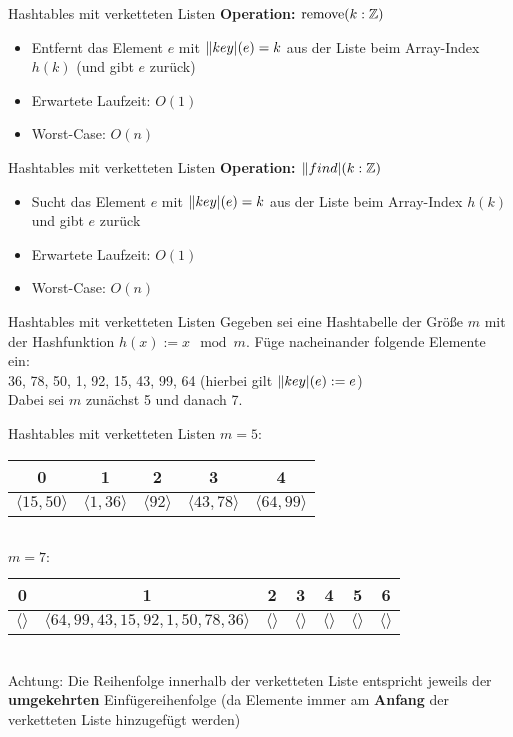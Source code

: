 \begin{frame}{Hashtables mit verketteten Listen}
	\textbf{Operation: $\|remove|(k : \Z)$} \\[0,125cm]
	\begin{itemize}
		\item Entfernt das Element $e$ mit $\key(e) = k$ aus der Liste beim Array-Index $h(k)$ (und gibt $e$ zurück)
		\pause
		\item Erwartete Laufzeit: $O(1)$
		\item Worst-Case: $O(n)$
	\end{itemize}
\end{frame}

\begin{frame}{Hashtables mit verketteten Listen}
	\textbf{Operation: $\|find|(k : \Z)$} \\[0,125cm]
	\begin{itemize}
		\item Sucht das Element $e$ mit $\key(e) = k$ aus der Liste beim Array-Index $h(k)$ und gibt $e$ zurück
		\pause
		\item Erwartete Laufzeit: $O(1)$
		\item Worst-Case: $O(n)$
	\end{itemize}
\end{frame}


\begin{frame}{Hashtables mit verketteten Listen}
	Gegeben sei eine Hashtabelle der Größe $m$ mit der Hashfunktion $h(x) := x \mod m$. Füge nacheinander folgende Elemente ein: \\ 
	36, 78, 50, 1, 92, 15, 43, 99, 64 \quad  (hierbei gilt $\key(e) := e$) \\
	Dabei sei $m$ zunächst 5 und danach 7.
\end{frame}

\begin{frame}{Hashtables mit verketteten Listen}
	\solutionheading
	$m = 5:$
	\begin{tabular}{ | c | c | c | c | c | }
		\hline
		0 & 1 & 2 & 3 & 4
		\\ \hline
		$\langle 15, 50 \rangle$ & $\langle 1,36 \rangle$ & $\langle 92 \rangle$ & $\langle 43,78 \rangle$ & $\langle 64,99 \rangle$
		\\ \hline
	\end{tabular}
	\\[0,64cm]
	$m = 7:$
	\begin{tabular}{ | c | c | c | c | c | c | c |}
		\hline
		0 & 1 & 2 & 3 & 4 & 5 & 6
		\\ \hline
		$\langle  \rangle$ & $\langle 64, 99, 43, 15, 92, 1, 50, 78, 36 \rangle$ & $\langle  \rangle$ & $\langle  \rangle$ & $\langle  \rangle$ & $\langle  \rangle$ & $\langle  \rangle$
		\\ \hline
	\end{tabular}
	\\[0,5cm]
	Achtung: Die Reihenfolge innerhalb der verketteten Liste entspricht jeweils der \textbf{umgekehrten} Einfügereihenfolge (da Elemente immer am \textbf{Anfang} der verketteten Liste hinzugefügt werden) 
\end{frame}

